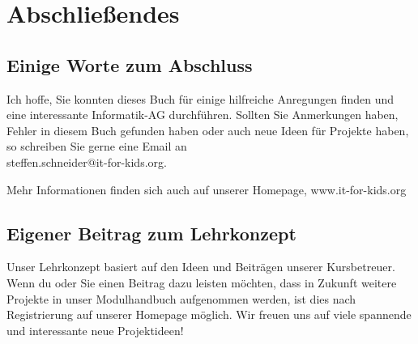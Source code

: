 \chapter{Abschließendes}

\section{Einige Worte zum Abschluss}

Ich hoffe, Sie konnten dieses Buch für einige hilfreiche Anregungen finden und eine interessante Informatik-AG durchführen. Sollten Sie Anmerkungen haben, Fehler in diesem Buch gefunden haben oder auch neue Ideen für Projekte haben, so schreiben Sie gerne eine Email an \\ \mbox{steffen.schneider$@$it-for-kids.org}.

Mehr Informationen finden sich auch auf unserer Homepage, www.it-for-kids.org

\section{Eigener Beitrag zum Lehrkonzept}

Unser Lehrkonzept basiert auf den Ideen und Beiträgen unserer Kursbetreuer. Wenn du oder Sie einen Beitrag dazu leisten möchten, dass in Zukunft weitere Projekte in unser Modulhandbuch aufgenommen werden, ist dies nach Registrierung auf unserer Homepage möglich. Wir freuen uns auf viele spannende und interessante neue Projektideen!

